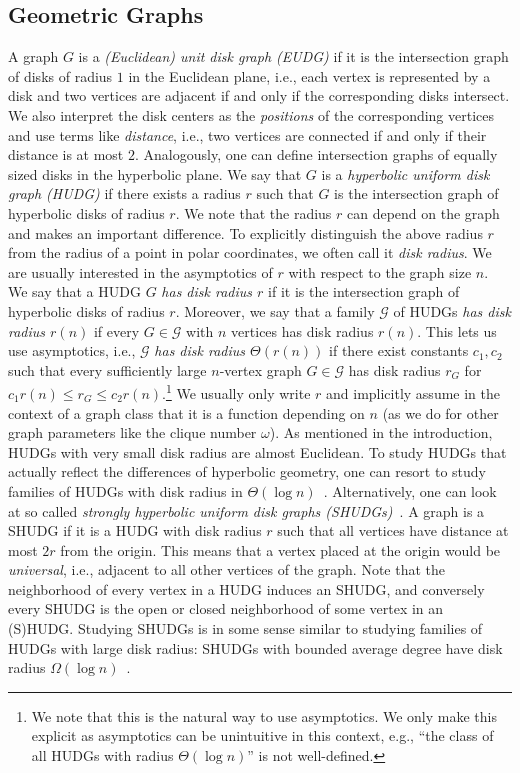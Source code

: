 \documentclass[11pt]{article}
\newcommand{\calG}{\ensuremath{\mathcal{G}}\xspace}
\begin{document}
\subsection{Geometric Graphs}
%
A graph $G$ is a \emph{(Euclidean) unit disk graph (EUDG)} if it is the intersection graph of disks of radius $1$ in the Euclidean plane, i.e., each vertex is represented by a disk and two vertices are adjacent if and only if the corresponding disks intersect.
We also interpret the disk centers as the \emph{positions} of the corresponding vertices and use terms like \emph{distance}, i.e., two vertices are connected if and only if their distance is at most $2$.
Analogously, one can define intersection graphs of equally sized disks in the hyperbolic plane.
We say that $G$ is a \emph{hyperbolic uniform disk graph (HUDG)} if there exists a radius $r$ such that $G$ is the intersection graph of hyperbolic disks of radius $r$.
We note that the radius $r$ can depend on the graph and makes an important difference.
To explicitly distinguish the above radius $r$ from the radius of a point in polar coordinates, we often call it \emph{disk radius}.
%
We are usually interested in the asymptotics of $r$ with respect to the graph size $n$.
We say that a HUDG $G$ \emph{has disk radius $r$} if it is the intersection graph of hyperbolic disks of radius $r$.
Moreover, we say that a family $\calG$ of HUDGs \emph{has disk radius $r(n)$} if every $G \in \calG$ with $n$ vertices has disk radius $r(n)$.
This lets us use asymptotics, i.e., $\calG$ \emph{has disk radius $\Theta(r(n))$} if there exist constants $c_1, c_2$ such that every sufficiently large $n$-vertex graph $G \in \calG$ has disk radius $r_G$ for $c_1 r(n) \le r_G \le c_2 r(n)$.\footnote{We note that this is the natural way to use asymptotics.
  We only make this explicit as asymptotics can be unintuitive in this context, e.g., \enquote{the class of all HUDGs with radius $\Theta(\log n)$} is not well-defined.}
We usually only write $r$ and implicitly assume in the context of a graph class that it is a function depending on $n$ (as we do for other graph parameters like the clique number $\omega$).
%
As mentioned in the introduction, HUDGs with very small disk radius are almost Euclidean.
To study HUDGs that actually reflect the differences of hyperbolic geometry, one can resort to study families of HUDGs with disk radius in $\Theta(\log n)$~\cite{Struc_Indep_Hyper_Unifor_Disk_Graph-Blaesius25}.
Alternatively, one can look at so called \emph{strongly hyperbolic uniform disk graphs (SHUDGs)}~\cite{blasius_strongly_2023}.
A graph is a SHUDG if it is a HUDG with disk radius $r$ such that all vertices have distance at most $2r$ from the origin.
This means that a vertex placed at the origin would be \emph{universal}, i.e., adjacent to all other vertices of the graph.
Note that the neighborhood of every vertex in a HUDG induces an SHUDG, and conversely every SHUDG is the open or closed neighborhood of some vertex in an (S)HUDG.
Studying SHUDGs is in some sense similar to studying families of HUDGs with large disk radius: SHUDGs with bounded average degree have disk radius $\Omega(\log n)$~\cite{blasius_strongly_2023}.
%
%
% 
%
%
%
\end{document}
